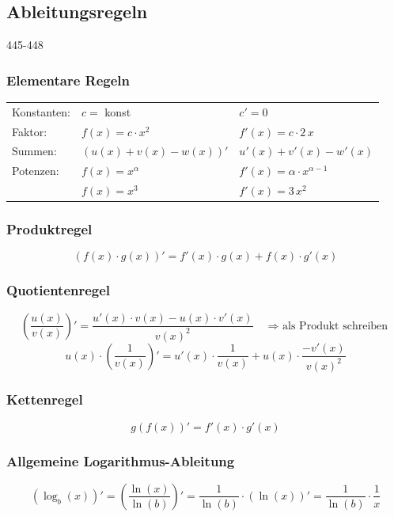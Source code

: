 \subsection{Ableitungsregeln}{445-448}

\subsubsection{Elementare Regeln}

\vspace{-0.2cm}
\renewcommand{\arraystretch}{1.6}
\begin{tabular}{lll}
    Konstanten:     & $c =$ konst                           & $c' = 0$ \\
    Faktor:         & $f(x) = c \cdot x^2$                  & $f'(x) = c \cdot 2 \, x $ \\
    Summen:         & $(u(x) + v(x) - w(x))' $              & $u'(x) + v'(x) - w'(x)$ \\
    Potenzen:       & $f(x) = x^{\alpha}$                   & $f'(x) = \alpha \cdot x^{\alpha - 1}$ \\
                    & $f(x) = x^3$                          & $f'(x) = 3 \, x^2$       
\end{tabular}


\subsubsection{Produktregel}
\vspace{-0.3cm}
$$ (f(x) \cdot g(x))' = f'(x) \cdot g(x) + f(x) \cdot g'(x) $$ 


\subsubsection{Quotientenregel}
\vspace{-0.3cm}
$$ \left( \frac{u(x)}{v(x)} \right) ' = \frac{u'(x) \cdot v(x) - u(x) \cdot v'(x)}{v(x) ^2} \quad \text{$\Rightarrow$ als Produkt schreiben} $$
$$ u(x) \cdot \left( \frac{1}{v(x)} \right) ' =  u'(x) \cdot \frac{1}{v(x)} + u(x) \cdot \frac{- v'(x)}{v(x)^2} $$


\subsubsection{Kettenregel}
\vspace{-0.3cm}
$$ g(f(x))' =  f'(x) \cdot g'(x) $$ 

\subsubsection{Allgemeine Logarithmus-Ableitung}
\vspace{-0.3cm}
$$ (\log_b(x))' = \left( \frac{\ln(x)}{\ln(b)} \right)' = \frac{1}{\ln(b)} \cdot (\ln(x))' = \frac{1}{\ln(b)} \cdot \frac{1}{x} $$



